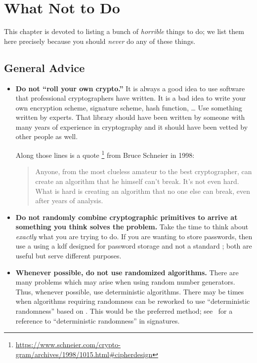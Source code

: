 \chapter{What Not to Do}
\label{chap:do_not}

This chapter is devoted to listing a bunch of \emph{horrible}
things to do;
we list them here precisely because you should \emph{never}
do any of these things.

\section{General Advice}

\begin{itemize}
\item \textbf{Do not ``roll your own crypto.''}
    It is always a good idea to use software that professional cryptographers
        have written.
    It is a bad idea to write your own \gls{encryption scheme},
        \gls{signature} scheme,
        \gls{hash function}, \dots
    Use something written by experts.
    That library should have been written by someone with many years
        of experience in cryptography and it should have been vetted
        by other people as well.

    Along those lines is a quote%
    \footnote{\url{https://www.schneier.com/crypto-gram/archives/1998/1015.html\#cipherdesign}}
    from Bruce Schneier in 1998:

\begin{quote}
    Anyone, from the most clueless amateur to the best cryptographer,
    can create an algorithm that he himself can't break.
    It's not even hard. What is hard is creating an algorithm
    that no one else can break, even after years of analysis.
\end{quote}

\item \textbf{Do not randomly combine cryptographic primitives
    to arrive at something you think solves the problem.}
    Take the time to think about \emph{exactly} what you are trying to do.
    If you are wanting to store passwords,
    then use a using a \gls{kdf} designed
    for password storage
    and not a standard ;
    both are useful but serve different purposes.

\item \textbf{Whenever possible, do not use randomized algorithms.}
    There are many problems which may arise when using
        random number generators.
    Thus, whenever possible, use deterministic algorithms.
    There may be times when algorithms requiring randomness
    can be reworked to use ``deterministic randomness'' based on
    .
    This would be the preferred method;
    see~\cite{rfc6979} for a reference to ``deterministic randomness''
    in \glspl{signature}.


\end{itemize}
